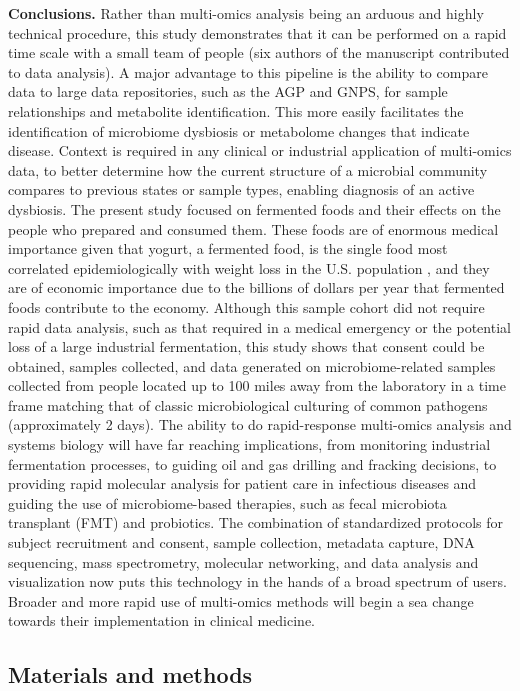 \textbf{Conclusions.} Rather than multi-omics analysis being an arduous and highly
technical procedure, this study demonstrates that it can be performed on a rapid
time scale with a small team of people (six authors of the manuscript contributed
to data analysis). A major advantage to this pipeline is the ability to compare
data to large data repositories, such as the AGP and GNPS, for sample relationships
and metabolite identification. This more easily facilitates the identification of
microbiome dysbiosis or metabolome changes that indicate disease. Context is
required in any clinical or industrial application of multi-omics data, to better
determine how the current structure of a microbial community compares to previous
states or sample types, enabling diagnosis of an active dysbiosis. The present
study focused on fermented foods and their effects on the people who prepared and
consumed them. These foods are of enormous medical importance given that yogurt, a
fermented food, is the single food most correlated epidemiologically with weight
loss in the U.S. population \cite{Mozaffarian2011}, and they are of economic
importance due to the billions of dollars per year that fermented foods contribute
to the economy. Although this sample cohort did not require rapid data analysis,
such as that required in a medical emergency or the potential loss of a large
industrial fermentation, this study shows that consent could be obtained, samples
collected, and data generated on microbiome-related samples collected from people
located up to 100 miles away from the laboratory in a time frame matching that of
classic microbiological culturing of common pathogens (approximately 2 days). The
ability to do rapid-response multi-omics analysis and systems biology will have far
reaching implications, from monitoring industrial fermentation processes, to guiding
oil and gas drilling and fracking decisions, to providing rapid molecular analysis
for patient care in infectious diseases and guiding the use of microbiome-based
therapies, such as fecal microbiota transplant (FMT) \cite{Rossen2015} and probiotics.
The combination of standardized protocols for subject recruitment and consent, sample
collection, metadata capture, DNA sequencing, mass spectrometry, molecular networking,
and data analysis and visualization now puts this technology in the hands of a broad
spectrum of users. Broader and more rapid use of multi-omics methods will begin a sea
change towards their implementation in clinical medicine.

\subsection{Materials and methods}

